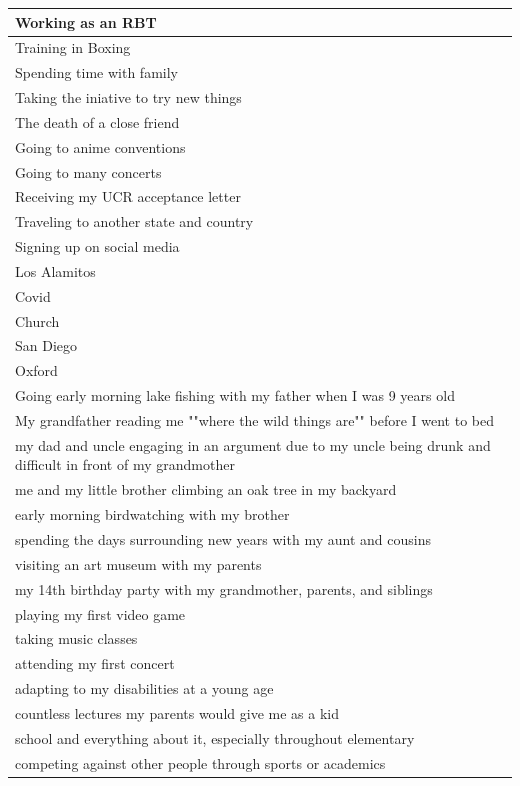 \documentclass[
  .7em,
  letterpaper,
  DIV=11,
  numbers=noendperiod]{scrartcl}
\begin{document}
\begin{table}
\begin{tabular}{l}
\hline
Working as an RBT\\
\hline
Training in Boxing\\
\hline
Spending time with family\\
\hline
Taking the iniative to try new things\\
\hline
The death of a close friend\\
\hline
Going to anime conventions\\
\hline
Going to many concerts\\
\hline
Receiving my UCR acceptance letter\\
\hline
Traveling to another state and country\\
\hline
Signing up on social media\\
\hline
Los Alamitos\\
\hline
Covid\\
\hline
Church\\
\hline
San Diego\\
\hline
Oxford\\
\hline
Going early morning lake fishing with my father when I was 9 years old\\
\hline
My grandfather reading me ""where the wild things are"" before I went to bed\\
\hline
my dad and uncle engaging in an argument due to my uncle being drunk and difficult in front of my grandmother\\
\hline
me and my little brother climbing an oak tree in my backyard\\
\hline
early morning birdwatching with my brother\\
\hline
spending the days surrounding new years with my aunt and cousins\\
\hline
visiting an art museum with my parents\\
\hline
my 14th birthday party with my grandmother, parents, and siblings\\
\hline
playing my first video game\\
\hline
taking music classes\\
\hline
attending my first concert\\
\hline
adapting to my disabilities at a young age\\
\hline
countless lectures my parents would give me as a kid\\
\hline
school and everything about it, especially throughout elementary\\
\hline
competing against other people through sports or academics\\

\end{tabular}
\end{table}
\end{document}
